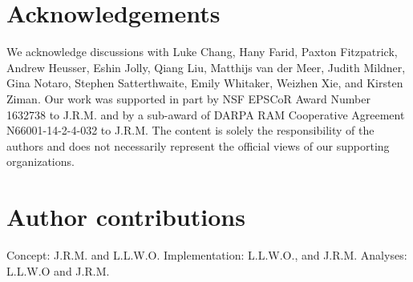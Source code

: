 \documentclass[english]{article}
\begin{document}
\section*{Acknowledgements}
We acknowledge discussions with Luke Chang, Hany Farid, Paxton
Fitzpatrick, Andrew Heusser, Eshin Jolly, Qiang Liu, Matthijs van der
Meer, Judith Mildner, Gina Notaro, Stephen Satterthwaite, Emily
Whitaker, Weizhen Xie, and Kirsten Ziman. Our work was supported in
part by NSF EPSCoR Award Number 1632738 to J.R.M. and by a sub-award
of DARPA RAM Cooperative Agreement N66001-14-2-4-032 to J.R.M.  The
content is solely the responsibility of the authors and does not
necessarily represent the official views of our supporting
organizations.

\section*{Author contributions}
Concept: J.R.M. and L.L.W.O. Implementation: L.L.W.O., and
J.R.M.  Analyses: L.L.W.O and J.R.M.



\end{document}
